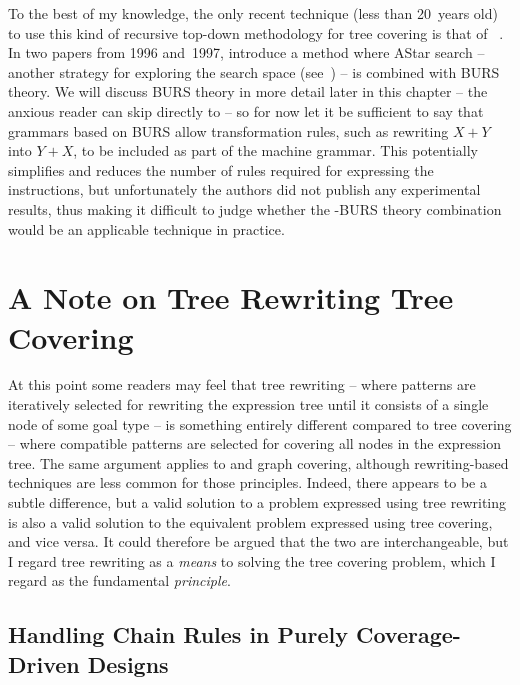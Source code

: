 {To the best of my knowledge, the only recent technique (less than 20~years old)
to use this kind of recursive top-down methodology for \gls{tree covering} is
that of \citeauthor{Nymeyer1996}~\cite{Nymeyer1996, Nymeyer1997}.
%
In two papers
from 1996 and~1997, \citeauthor{Nymeyer1996} introduce a method where \gls{AStar
  search} -- another strategy for exploring the search space
(see~\cite{Norvig2010}) -- is combined with \gls{BURS} theory.
%
We will discuss
\gls{BURS} theory in more detail later in this chapter -- the anxious reader can
skip directly to \unskip%
 -- so for now let it be sufficient to say that \glspl{grammar} based on
 \gls{BURS} allow transformation \glspl{rule}, such as rewriting \mbox{$X + Y$}
 into \mbox{$Y + X$}, to be included as part of the \gls{machine grammar}.
%
This potentially simplifies and reduces the number of \glspl{rule}
required for expressing the \glspl{instruction}, but unfortunately the authors
did not publish any experimental results, thus making it difficult to judge
whether the \mbox{\tAStar-\gls{BURS}} theory combination would be an applicable
technique in practice.


\section{A Note on Tree Rewriting \vs Tree Covering}

At this point some readers may feel that \gls{tree rewriting} -- where
\glspl{pattern} are iteratively selected for rewriting the \gls{expression tree}
until it consists of a single \gls{node} of some goal type -- is something
entirely different compared to \gls{tree covering} -- where compatible
\glspl{pattern} are selected for covering all \glspl{node} in the \gls{expression tree}.
%
The same argument applies to  and \gls{graph
  covering}, although rewriting-based techniques are less common for those
\glspl{principle}.
%
Indeed, there appears to be a subtle difference, but a valid
solution to a problem expressed using \gls{tree rewriting} is also a valid
solution to the equivalent problem expressed using \gls{tree covering}, and vice
versa.
%
It could therefore be argued that the two are interchangeable, but I
regard \gls{tree rewriting} as a \emph{means} to solving the \gls{tree covering}
problem, which I regard as the fundamental \emph{\gls{principle}}.


\subsection{Handling Chain Rules in Purely Coverage-Driven Designs}

}
